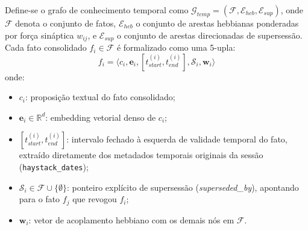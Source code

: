 \documentclass[10pt,conference,twocolumn]{IEEEtran}
\begin{document}
Define-se o grafo de conhecimento temporal como $\mathcal{G}_{temp} = (\mathcal{F}, \mathcal{E}_{heb}, \mathcal{E}_{sup})$, onde $\mathcal{F}$ denota o conjunto de fatos, $\mathcal{E}_{heb}$ o conjunto de arestas hebbianas ponderadas por força sináptica $w_{ij}$, e $\mathcal{E}_{sup}$ o conjunto de arestas direcionadas de supersessão. Cada fato consolidado $f_i \in \mathcal{F}$ é formalizado como uma 5-upla:
\begin{equation}
f_i = \langle c_i, \mathbf{e}_i, [t_{start}^{(i)}, t_{end}^{(i)}], \mathcal{S}_i, \mathbf{w}_i \rangle
\end{equation}
onde:
\begin{itemize}
    \item $c_i$: proposição textual do fato consolidado;
    \item $\mathbf{e}_i \in \mathbb{R}^d$: embedding vetorial denso de $c_i$;
    \item $[t_{start}^{(i)}, t_{end}^{(i)}]$: intervalo fechado à esquerda de validade temporal do fato, extraído diretamente dos metadados temporais originais da sessão (\texttt{haystack\_dates});
    \item $\mathcal{S}_i \in \mathcal{F} \cup \{\emptyset\}$: ponteiro explícito de supersessão (\textit{superseded\_by}), apontando para o fato $f_j$ que revogou $f_i$;
    \item $\mathbf{w}_i$: vetor de acoplamento hebbiano com os demais nós em $\mathcal{F}$.
\end{itemize}
\end{document}
